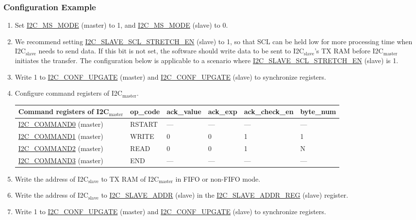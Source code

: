 \documentclass[main\_\_EN.tex]{subfiles}
\begin{document}
\subsubsection{Configuration Example}
\begin{enumerate}
\item Set \hyperref[fielddesc:I2CMSMODE]{I2C\_MS\_MODE} (master) to 1, and \hyperref[fielddesc:I2CMSMODE]{I2C\_MS\_MODE} (slave) to 0.
\item We recommend setting \hyperref[fielddesc:I2CSLAVESCLSTRETCHEN]{I2C\_SLAVE\_SCL\_STRETCH\_EN} (slave) to 1, so that SCL can be held low for more processing time when I2C$_\text{slave}$ needs to send data. If this bit is not set, the software should write data to be sent to I2C$_\text{slave}$'s TX RAM before I2C$_\text{master}$ initiates the transfer. The configuration below is applicable to a scenario where \hyperref[fielddesc:I2CSLAVESCLSTRETCHEN]{I2C\_SLAVE\_SCL\_STRETCH\_EN} (slave) is 1. 
\item Write 1 to \hyperref[fielddesc:I2CCONFUPGATE]{I2C\_CONF\_UPGATE} (master) and \hyperref[fielddesc:I2CCONFUPGATE]{I2C\_CONF\_UPGATE} (slave) to synchronize registers.
\item Configure command registers of I2C$_\text{master}$.
\begin{longtable}{ | p{4cm} | p{2cm} | p{2cm} | p{2cm} |p{2cm} | p{2cm} |}
\hline\rowcolor{lightgray}
Command registers of I2C$_\text{master}$& op\_code & ack\_value&ack\_exp&ack\_check\_en&byte\_num  \\ \hline
\hyperref[fielddesc:I2CCOMMAND0]{I2C\_COMMAND0} (master)& RSTART& ---&---&---&---  \\ \hline
\hyperref[fielddesc:I2CCOMMAND1]{I2C\_COMMAND1} (master)& WRITE& 0&0&1&1  \\ \hline
\hyperref[fielddesc:I2CCOMMAND2]{I2C\_COMMAND2} (master)& READ& 0&0&1&N  \\ \hline
\hyperref[fielddesc:I2CCOMMAND3]{I2C\_COMMAND3} (master)& END& ---&---&---&---  \\ \hline
\end{longtable}
\item Write the address of I2C$_\text{slave}$ to TX RAM of I2C$_\text{master}$ in FIFO or non-FIFO mode.
\item Write the address of I2C$_\text{slave}$ to \hyperref[fielddesc:I2CSLAVEADDR]{I2C\_SLAVE\_ADDR} (slave) in the \hyperref[regdesc:I2CSLAVEADDRREG]{I2C\_SLAVE\_ADDR\_REG} (slave) register.
\item Write 1 to \hyperref[fielddesc:I2CCONFUPGATE]{I2C\_CONF\_UPGATE} (master) and \hyperref[fielddesc:I2CCONFUPGATE]{I2C\_CONF\_UPGATE} (slave) to synchronize registers.

\end{enumerate}
\end{document}
